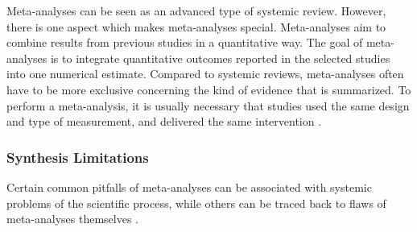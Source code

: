 \documentclass[../../../main.tex]{subfiles}
\begin{document}
Meta-analyses can be seen as an advanced type of systemic review. However, there is one aspect which makes meta-analyses special. Meta-analyses aim to combine results from previous studies in a quantitative way. The goal of meta-analyses is to integrate quantitative outcomes reported in the selected studies into one numerical estimate. Compared to systemic reviews, meta-analyses often have to be more exclusive concerning the kind of evidence that is summarized. To perform a meta-analysis, it is usually necessary that studies used the same design and type of measurement, and delivered the same intervention \autocite{Harrer2021}.

\subsubsection{Synthesis Limitations}

Certain common pitfalls of meta-analyses can be associated with systemic problems of the scientific process, while others can be traced back to flaws of meta-analyses themselves \autocite{Harrer2021}.
\end{document}
